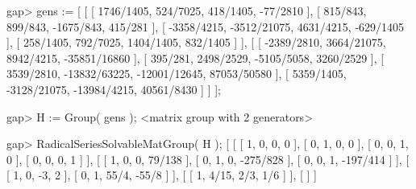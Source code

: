 \endexample


\beginexample
gap> gens := 
[ [ [ 1746/1405, 524/7025, 418/1405, -77/2810 ], 
    [ 815/843, 899/843, -1675/843, 415/281 ],
    [ -3358/4215, -3512/21075, 4631/4215, -629/1405 ],
    [ 258/1405, 792/7025, 1404/1405, 832/1405 ] ],
  [ [ -2389/2810, 3664/21075, 8942/4215, -35851/16860 ],
    [ 395/281, 2498/2529, -5105/5058, 3260/2529 ],
    [ 3539/2810, -13832/63225, -12001/12645, 87053/50580 ],
    [ 5359/1405, -3128/21075, -13984/4215, 40561/8430 ] ] ];

gap> H := Group( gens );
<matrix group with 2 generators>
     
gap> RadicalSeriesSolvableMatGroup( H );
[ [ [ 1, 0, 0, 0 ], [ 0, 1, 0, 0 ], [ 0, 0, 1, 0 ], [ 0, 0, 0, 1 ] ],
  [ [ 1, 0, 0, 79/138 ], [ 0, 1, 0, -275/828 ], [ 0, 0, 1, -197/414 ] ],
  [ [ 1, 0, -3, 2 ], [ 0, 1, 55/4, -55/8 ] ], 
  [ [ 1, 4/15, 2/3, 1/6 ] ], 
  [  ] ]


\endexample























